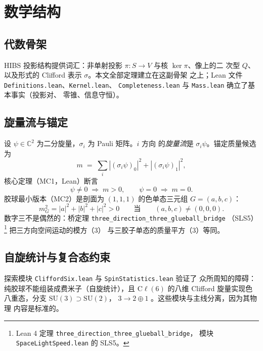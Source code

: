 \documentclass[aps,prd,preprint,superscriptaddress,amsmath,amssymb]{revtex4-2}
\begin{document}
\section{数学结构}\label{sec:math}

\subsection{代数骨架}

HIBS 投影结构提供词汇：非单射投影 $\pi:S\to V$ 与核 $\ker\pi$、像上的二
次型 $Q$、以及形式的 Clifford 表示 $\sigma$。本文全部定理建立在这副骨架
之上；Lean 文件 \texttt{Definitions.lean}、\texttt{Kernel.lean}、
\texttt{Completeness.lean} 与 \texttt{Mass.lean} 确立了基本事实（投影对、
零锥、信息守恒）\cite{ProjectionPhysics}。

\subsection{旋量流与锚定}

设 $\psi\in\mathbb{C}^2$ 为二分旋量，$\sigma_i$ 为 Pauli 矩阵。$i$ 方向
的\emph{旋量流}是 $\sigma_i\psi$。锚定质量候选为
\begin{equation}
m \;=\; \sum_i |(\sigma_i\psi)_0|^2 + |(\sigma_i\psi)_1|^2 ,
\end{equation}
核心定理（MC1，Lean）断言
\begin{equation}
\psi \neq 0 \;\Longrightarrow\; m > 0 ,
\qquad
\psi = 0 \;\Longrightarrow\; m = 0 .
\end{equation}
胶球最小版本（MC2）是剖面为 $(1,1,1)$ 的色单态三元组 $G=(a,b,c)$：
\begin{equation}
m_G^2 = |a|^2 + |b|^2 + |c|^2 > 0
\qquad\text{当}\qquad (a,b,c)\neq(0,0,0).
\end{equation}
数字三不是偶然的：桥定理 \texttt{three\_direction\_three\_glueball\_bridge}
（SLS5）\footnote{Lean 4 定理 \texttt{three\_direction\_three\_glueball\_bridge}，
模块 \texttt{SpaceLightSpeed.lean} 的 SLS5。} 把三方向空间运动的模方（3）
与三胶子单态的质量平方（3）等同。

\subsection{自旋统计与复合态约束}

探索模块 \texttt{CliffordSix.lean} 与 \texttt{SpinStatistics.lean} 验证了
众所周知的障碍：纯胶球不能组装成费米子（自旋统计），且 $\mathrm{C}\ell(6)$
的八维 Clifford 旋量实现色八重态，分支 $\mathrm{SU}(3)\supset\mathrm{SU}(2)$，
$3\to 2\oplus 1$ \cite{ProjectionPhysics}。这些模块与主线分离，因为其物理
内容是标准的。
\end{document}
